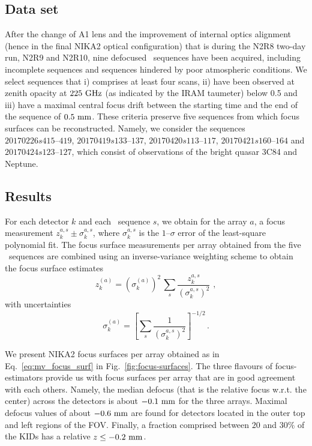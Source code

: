 \subsection{Data set}

After the change of A1 lens and the improvement of internal optics
alignment (hence in the final NIKA2 optical configuration) that is
during the N2R8 two-day run, N2R9 and N2R10,   
nine defocused \bm\ sequences have been acquired, including incomplete
sequences and sequences hindered by poor atmospheric conditions.
We select sequences that i) comprises at least four scans, ii) have been
observed at zenith opacity at $225~\rm{GHz}$ (as indicated by
the IRAM taumeter) below 0.5 and iii) have a maximal central focus
drift between the starting time and the end of the sequence of
$0.5~\rm{mm}$. These criteria preserve five sequences from which focus
surfaces can be reconstructed. Namely, we consider the sequences
$20170226s415\mbox{--}419$, $20170419s133\mbox{--}137$, $20170420s113\mbox{--}117$,
$20170421s160\mbox{--}164$ and $20170424s123\mbox{--}127$, which consist of observations
of the bright quasar 3C84 and Neptune.

\subsection{Results}
For each detector $k$ and each \bm\ sequence $s$, we obtain for
the array $a$, a focus measurement $z_k^{a, s} \pm \sigma_k^{a, s}$,
where $\sigma_k^{a, s}$ is the $1\mbox{--}\sigma$ error of the least-square
polynomial fit. The focus surface measurements per array obtained from the five
\bm\ sequences are combined using an inverse-variance weighting
scheme to obtain the focus surface estimates 
\begin{equation}
\label{eq:mv_focus_surf}
z_k^{(a)} = \left( \sigma_k^{(a)} \right)^2 \,  \sum_s \frac{z_k^{a,s}}{\left(\sigma_k^{a,s}\right)^2}\, \,  ,
\end{equation}
with uncertainties 
\begin{equation}
\label{eq:error_mv_focus_surf}
\sigma_k^{(a)} = \left[ \sum_s \frac{1}{\left(\sigma_k^{a,s}\right)^2}\right]^{-1/2}\, .
\end{equation}


We present NIKA2 focus surfaces per array obtained as in
Eq.~\ref{eq:mv_focus_surf} 
in Fig.~\ref{fig:focus-surfaces}.
The three flavours of focus-estimators provide us with focus surfaces
per array that are in good agreement with each others.  %
Namely, the median defocus (that is the relative focus w.r.t. the center)
across the detectors is about
$-0.1~\rm{mm}$ for the three arrays. Maximal defocus values of about
$-0.6~\rm{mm}$ are found for detectors located in the outer top and
left regions of the FOV. Finally, a fraction comprised between $20$
and $30\%$ of the KIDs has a relative $z\le -0.2~\rm{mm}$.  

